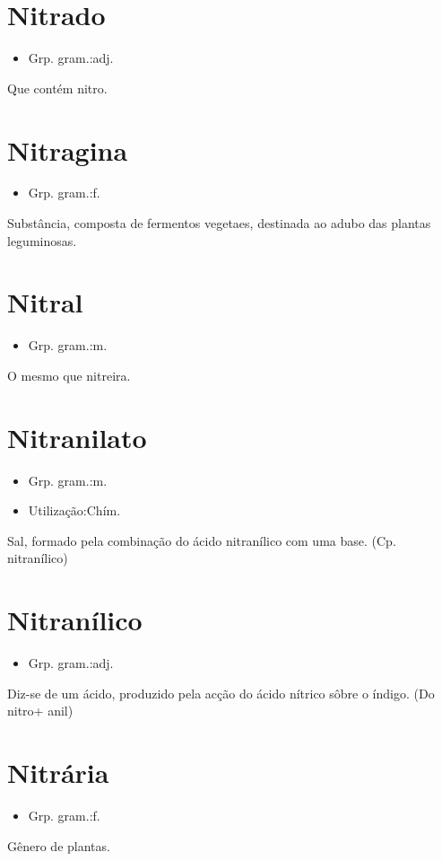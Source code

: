 \section{Nitrado}
\begin{itemize}
\item {Grp. gram.:adj.}
\end{itemize}
Que contém nitro.
\section{Nitragina}
\begin{itemize}
\item {Grp. gram.:f.}
\end{itemize}
Substância, composta de fermentos vegetaes, destinada ao adubo das plantas leguminosas.
\section{Nitral}
\begin{itemize}
\item {Grp. gram.:m.}
\end{itemize}
O mesmo que \textunderscore nitreira\textunderscore .
\section{Nitranilato}
\begin{itemize}
\item {Grp. gram.:m.}
\end{itemize}
\begin{itemize}
\item {Utilização:Chím.}
\end{itemize}
Sal, formado pela combinação do ácido nitranílico com uma base.
(Cp. \textunderscore nitranílico\textunderscore )
\section{Nitranílico}
\begin{itemize}
\item {Grp. gram.:adj.}
\end{itemize}
Diz-se de um ácido, produzido pela acção do ácido nítrico sôbre o índigo.
(Do \textunderscore nitro\textunderscore  + \textunderscore anil\textunderscore )
\section{Nitrária}
\begin{itemize}
\item {Grp. gram.:f.}
\end{itemize}
Gênero de plantas.
